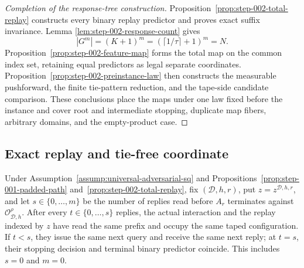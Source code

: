 \begin{proof}[Completion of the response-tree construction]
Proposition~\ref{prop:step-002-total-replay} constructs every binary replay
predictor and proves exact suffix invariance.  Lemma
\ref{lem:step-002-response-count} gives
\[
|G^m|=(K+1)^m=(\lceil1/\tau\rceil+1)^m=N.
\]
Proposition~\ref{prop:step-002-feature-map} forms the total map on the common
index set, retaining equal predictors as legal separate coordinates.
Proposition~\ref{prop:step-002-preinstance-law} then constructs the
measurable pushforward, the finite tie-pattern reduction, and the tape-side
candidate comparison.  These conclusions place the maps under one law fixed
before the instance and cover root and intermediate stopping, duplicate map
fibers, arbitrary domains, and the empty-product case.
\end{proof}

\subsection{Exact replay and tie-free coordinate}\label{app:step-003}

\begin{lemma}
\label{lem:step-003-prefix-synchronization}
Under Assumption~\ref{assump:universal-adversarial-sq} and
Propositions~\ref{prop:step-001-padded-path}
and~\ref{prop:step-002-total-replay}, fix \((\mathcal D,h,r)\), put
\(z=z^{\mathcal D,h,r}\), and let
\(s\in\{0,\ldots,m\}\) be the number of replies read before \(A_r\)
terminates against \(\mathcal O^\rho_{\mathcal D,h}\).  After every
\(t\in\{0,\ldots,s\}\) replies, the actual interaction and the replay
indexed by \(z\) have read the same prefix and occupy the
same taped configuration.  If \(t<s\), they issue the same next query and
receive the same next reply; at \(t=s\), their stopping decision and
terminal binary predictor coincide.  This includes \(s=0\) and \(m=0\).
\end{lemma}

